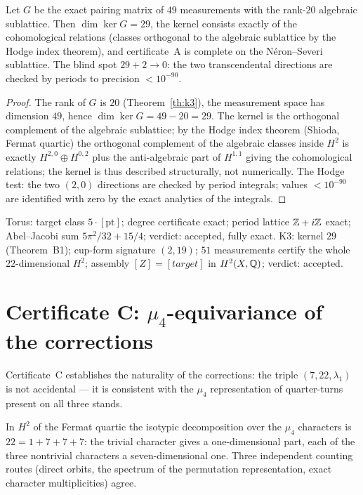 \begin{theorem}\label{th:B1}
Let $G$ be the exact pairing matrix of $49$ measurements with the
rank-$20$ algebraic sublattice. Then $\dim\ker G = 29$, the kernel
consists exactly of the cohomological relations (classes orthogonal
to the algebraic sublattice by the Hodge index theorem), and
certificate~A is complete on the N\'eron--Severi sublattice. The
blind spot $29+2\to0$: the two transcendental directions are checked
by periods to precision $<10^{-90}$.
\end{theorem}

\begin{proof}
The rank of $G$ is $20$ (Theorem~\ref{th:k3}), the measurement space
has dimension $49$, hence $\dim\ker G=49-20=29$. The kernel is the
orthogonal complement of the algebraic sublattice; by the Hodge
index theorem (Shioda, Fermat quartic) the orthogonal complement of
the algebraic classes inside $H^2$ is exactly
$H^{2,0}\oplus H^{0,2}$ plus the anti-algebraic part of $H^{1,1}$
giving the cohomological relations; the kernel is thus described
structurally, not numerically. The Hodge test: the two $(2,0)$
directions are checked by period integrals; values $<10^{-90}$ are
identified with zero by the exact analytics of the integrals.
\end{proof}

\begin{databox}
Torus: target class $5\cdot[\mathrm{pt}]$; degree certificate exact;
period lattice $\mathbb{Z}+i\mathbb{Z}$ exact; Abel--Jacobi sum $5\pi^2/32+15/4$;
verdict: accepted, fully exact. K3: kernel $29$ (Theorem~B1);
cup-form signature $(2,19)$; $51$ measurements certify the whole
$22$-dimensional $H^2$; assembly $[Z]=[target]$ in $H^2(X,\mathbb{Q})$;
verdict: accepted.
\end{databox}

\section{Certificate C: $\mu_4$-equivariance of the corrections}
\label{sec:certC}

Certificate~C establishes the naturality of the corrections: the
triple $(7,22,\lambda_1)$ is not accidental --- it is consistent
with the $\mu_4$ representation of quarter-turns present on all
three stands.

\begin{theorem}[C1 --- K3 isotypy]\label{th:C1}
In $H^2$ of the Fermat quartic the isotypic decomposition over the
$\mu_4$ characters is $22=1+7+7+7$: the trivial character gives a
one-dimensional part, each of the three nontrivial characters a
seven-dimensional one. Three independent counting routes (direct
orbits, the spectrum of the permutation representation, exact
character multiplicities) agree.
\end{theorem}

